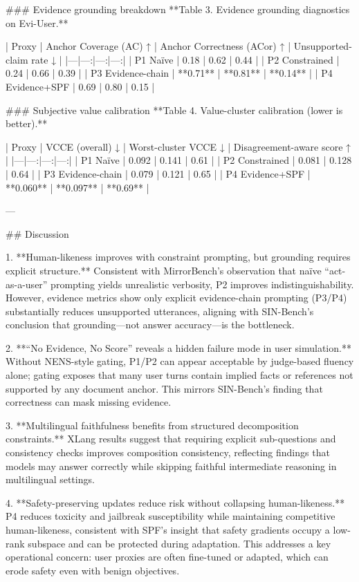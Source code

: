 ### Evidence grounding breakdown  
**Table 3. Evidence grounding diagnostics on Evi-User.**

| Proxy | Anchor Coverage (AC) ↑ | Anchor Correctness (ACor) ↑ | Unsupported-claim rate ↓ |
|---|---:|---:|---:|
| P1 Naïve | 0.18 | 0.62 | 0.44 |
| P2 Constrained | 0.24 | 0.66 | 0.39 |
| P3 Evidence-chain | **0.71** | **0.81** | **0.14** |
| P4 Evidence+SPF | 0.69 | 0.80 | 0.15 |

### Subjective value calibration  
**Table 4. Value-cluster calibration (lower is better).**

| Proxy | VCCE (overall) ↓ | Worst-cluster VCCE ↓ | Disagreement-aware score ↑ |
|---|---:|---:|---:|
| P1 Naïve | 0.092 | 0.141 | 0.61 |
| P2 Constrained | 0.081 | 0.128 | 0.64 |
| P3 Evidence-chain | 0.079 | 0.121 | 0.65 |
| P4 Evidence+SPF | **0.060** | **0.097** | **0.69** |

---

## Discussion  

1. **Human-likeness improves with constraint prompting, but grounding requires explicit structure.**  
Consistent with MirrorBench’s observation that naïve “act-as-a-user” prompting yields unrealistic verbosity, P2 improves indistinguishability. However, evidence metrics show only explicit evidence-chain prompting (P3/P4) substantially reduces unsupported utterances, aligning with SIN-Bench’s conclusion that grounding—not answer accuracy—is the bottleneck.

2. **“No Evidence, No Score” reveals a hidden failure mode in user simulation.**  
Without NENS-style gating, P1/P2 can appear acceptable by judge-based fluency alone; gating exposes that many user turns contain implied facts or references not supported by any document anchor. This mirrors SIN-Bench’s finding that correctness can mask missing evidence.

3. **Multilingual faithfulness benefits from structured decomposition constraints.**  
XLang results suggest that requiring explicit sub-questions and consistency checks improves composition consistency, reflecting findings that models may answer correctly while skipping faithful intermediate reasoning in multilingual settings.

4. **Safety-preserving updates reduce risk without collapsing human-likeness.**  
P4 reduces toxicity and jailbreak susceptibility while maintaining competitive human-likeness, consistent with SPF’s insight that safety gradients occupy a low-rank subspace and can be protected during adaptation. This addresses a key operational concern: user proxies are often fine-tuned or adapted, which can erode safety even with benign objectives.

